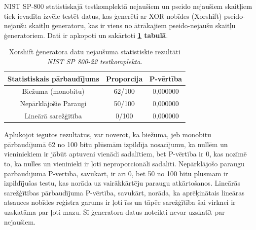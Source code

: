 \documentclass[12pt]{article}
\begin{document}
    NIST SP-800 statistiskajā testkomplektā nejaušiem un pseido nejaušiem skaitļiem tiek ievadīta izvēle testēt datus, kas ģenerēti ar XOR nobīdes (Xorshift) pseido-nejaušu skaitļu ģeneratoru, kas ir viens no ātrākajiem pseido-nejaušu skaitļu ģeneratoriem. Dati ir apkopoti un sakārtoti \textbf{\ref{rezultati_xor} tabulā}.

\begin{table}[!ht]
\centering

\begin{tabular}{ |c|c|c| }%
\hline
Statistiskais pārbaudījums & Proporcija & P-vērtība \\
\hline
Biežuma (monobitu) & 62/100 & 0,000000\\
\hline
Nepārklājošie Paraugi & 50/100 & 0,000000 \\
\hline
Lineārā sarežģītība & 0/100 & 0,000000 \\
\hline
\end{tabular}

\caption{Xorshift ģeneratora datu nejaušuma statistiskie rezultāti \\ \emph{NIST SP 800-22 testkomplektā}.\parencite{NIST_orig}}

\label{rezultati_xor}
\end{table}

  \FloatBarrier
     Aplūkojot iegūtos rezultātus, var novērot, ka biežuma, jeb monobitu pārbaudījumā 62 no 100 bitu plūsmām izpildīja nosacījumu, ka nullēm un vieniniekiem ir jābūt aptuveni vienādi sadalītiem, bet P-vērtība ir 0, kas nozīmē to, ka nulles un vieninieki ir ļoti neproporcionāli sadalīti. Nepārklājošo paraugu pārbaudījumā P-vērtība, savukārt, ir arī 0, bet 50 no 100 bitu plūsmām ir izpildījušas testu, kas norāda uz vairākkārtēju paraugu atkārtošanos.
    Lineārās sarežģītības pārbaudījuma P-vērtība, savukārt, norāda, ka aprēķinātais lineāras atsauces nobīdes reģistra garums ir ļoti īss un tāpēc sarežģītība šai virknei ir uzskatāma par ļoti mazu. Šī ģeneratora datus noteikti nevar uzskatīt par nejaušiem.


    
\end{document}
